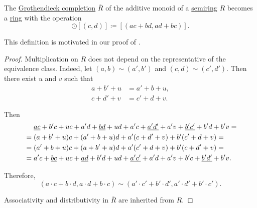 \begin{proposition}\label{thm:grothendieck_semiring_completion}
  The \hyperref[def:monoid_grothendieck_completion]{Grothendieck completion} \( \overline{R} \) of the additive monoid of a \hyperref[def:semiring]{semiring} \( R \) becomes a \hyperref[def:ring]{ring} with the operation
  \begin{equation*}
    [(a, b)] \odot [(c, d)] \coloneqq [(ac + bd, ad + bc)].
  \end{equation*}

  This definition is motivated in our proof of .
\end{proposition}
\begin{proof}
  Multiplication on \( R \) does not depend on the representative of the equivalence class. Indeed, let \( (a, b) \sim (a', b') \) and \( (c, d) \sim (c', d') \). Then there exist \( u \) and \( v \) such that
  \begin{align*}
    a + b' + u &= a' + b + u, \\
    c + d' + v &= c' + d + v.
  \end{align*}

  Then
  \begin{align*}
    &\phantom{{}={}}
    \hi{ac} + b'c + uc + a'd + \hi{bd} + ud + a'c + \hi{a'd'} + a'v + \hi{b'c'} + b'd + b'v
    = \\ &=
    (a + b' + u)c + (a' + b + u)d + a'(c + d' + v) + b'(c' + d + v)
    = \\ &=
    (a' + b + u)c + (a + b' + u)d + a'(c' + d + v) + b'(c + d' + v)
    = \\ &=
    a'c + \hi{bc} + uc + \hi{ad} + b'd + ud + \hi{a'c'} + a'd + a'v + b'c + \hi{b'd'} + b'v.
  \end{align*}

  Therefore,
  \begin{equation*}
    (a \cdot c + b \cdot d, a \cdot d + b \cdot c) \sim (a' \cdot c' + b' \cdot d', a' \cdot d' + b' \cdot c').
  \end{equation*}

  Associativity and distributivity in \( \overline{R} \) are inherited from \( R \).
\end{proof}


